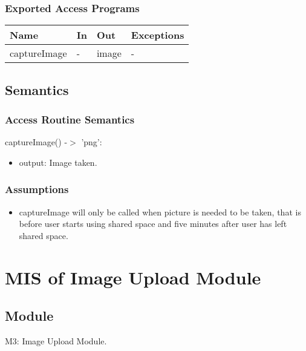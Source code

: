 \documentclass[12pt, titlepage]{article}
\begin{document}
\subsubsection{Exported Access Programs}

\begin{center}
\begin{tabular}{p{4cm} p{4cm} p{4cm} p{2cm}}
\hline
\textbf{Name} & \textbf{In} & \textbf{Out} & \textbf{Exceptions} \\
\hline
captureImage & - & image & - \\
\hline
\end{tabular}
\end{center}

\subsection{Semantics}

\subsubsection{Access Routine Semantics}

\noindent captureImage() -$>$ 'png':
\begin{itemize}
\item output: Image taken.
\end{itemize}

\subsubsection{Assumptions}
\begin{itemize}
\item captureImage will only be called when picture is needed to be taken, that is before user starts using shared space and five minutes after user has left shared space.
\end{itemize}


\newpage


\section{MIS of Image Upload Module} \label{Module} 

\subsection{Module}

M3: Image Upload Module.
\end{document}
